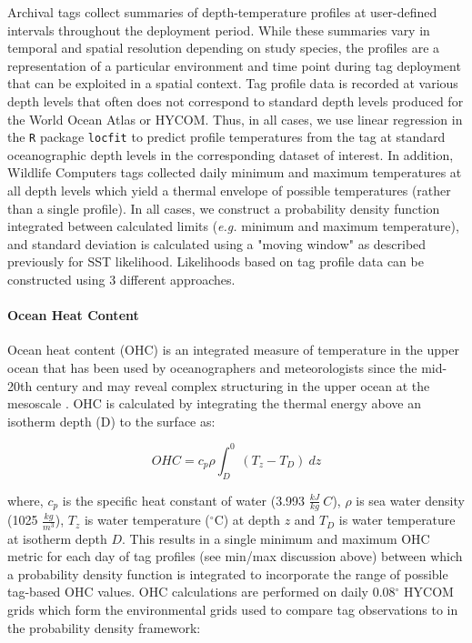 Archival tags collect summaries of depth-temperature profiles at
user-defined intervals throughout the deployment period. While these
summaries vary in temporal and spatial resolution depending on study
species, the profiles are a representation of a particular environment
and time point during tag deployment that can be exploited in a spatial
context. Tag profile data is recorded at various depth levels that often
does not correspond to standard depth levels produced for the World
Ocean Atlas or HYCOM. Thus, in all cases, we use linear regression in
the \texttt{R} package \texttt{locfit} to predict profile temperatures
from the tag at standard oceanographic depth levels in the corresponding
dataset of interest. In addition, Wildlife Computers tags collected
daily minimum and maximum temperatures at all depth levels which yield a
thermal envelope of possible temperatures (rather than a single
profile). In all cases, we construct a probability density function
integrated between calculated limits \citep{LeBris2013a} (\emph{e.g.} minimum
and maximum temperature), and standard deviation is calculated using a
"moving window" as described previously for SST likelihood.
Likelihoods based on tag profile data can be constructed using 3
different approaches.

\paragraph{Ocean Heat Content}%

Ocean heat content (OHC) is an integrated measure of temperature in the
upper ocean that has been used by oceanographers and meteorologists
since the mid-20th century \citep{Palmen1948} and may reveal complex
structuring in the upper ocean at the mesoscale \citep{Luo2015}. OHC is
calculated by integrating the thermal energy above an isotherm depth (D)
to the surface as:

\begin{equation}
OHC = c_p\rho\int_{D}^{0} (T_z - T_D)~dz
\label{eq:a1e3}
\end{equation}

where, $c_p$ is the specific heat constant of water (3.993
$\frac{kJ}{kg}~C$), $\rho$ is sea water density (1025
$\frac{kg}{m^3}$), $T_z$ is water temperature ($^{\circ}$C) at depth $z$
and $T_D$ is water temperature at isotherm depth $D$. This results
in a single minimum and maximum OHC metric for each day of tag profiles
(see min/max discussion above) between which a probability density
function is integrated to incorporate the range of possible tag-based
OHC values. OHC calculations are performed on daily 0.08$^{\circ}$ HYCOM grids
which form the environmental grids used to compare tag observations to
in the probability density framework:

